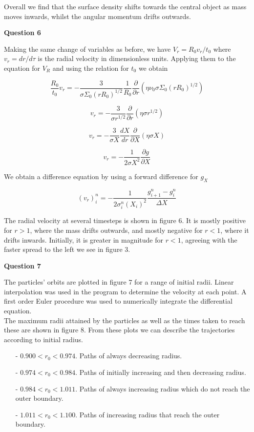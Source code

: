 \documentclass[12pt]{extarticle}
\begin{document}
Overall we find that the surface density shifts towards the central object as mass moves inwards, whilst the angular momentum drifts outwards.\\

\begin{center}
\textbf{Question 6}
\end{center}

Making the same change of variables as before, we have  $V_r = R_0 v_r/t_0$ where $v_r = dr/d \tau$ is the radial velocity in dimensionless units. Applying them to the equation for $V_R$ and using the relation for $t_0$ we obtain

$$\frac{R_0}{t_0}v_r = -\frac{3}{\sigma \Sigma_0 (rR_0)^{1/2}}\frac{1}{ R_0}\frac{\partial }{\partial r}(\eta \nu_0 \sigma\Sigma_0 (rR_0)^{1/2}) $$

$$v_r = -\frac{3}{\sigma r^{1/2}}\frac{\partial }{\partial r}(\eta \sigma r^{1/2})$$

$$v_r = -\frac{3}{\sigma X}\frac{dX}{dr}\frac{\partial }{\partial X}(\eta \sigma X)$$

$$v_r = -\frac{1}{2\sigma X^2}\frac{\partial g}{\partial X}$$

We obtain a difference equation by using a forward difference for $g_X$

$$(v_r)_i^n = -\frac{1}{2\sigma_i^n (X_i)^2}\frac{g_{i+1}^n - g_i^n}{\Delta X}$$

The radial velocity at several timesteps is shown in figure 6. It is mostly positive for $r>1$, where the mass drifts outwards, and mostly negative for $r<1$, where it drifts inwards. Initially, it is greater in magnitude  for $r<1$, agreeing with the faster spread to the left we see in figure 3.\\

\begin{center}
\textbf{Question 7}
\end{center}

The particles' orbits are plotted in figure 7 for a range of initial radii. Linear interpolation was used in the program to determine the velocity at each point. A first order Euler procedure was used to numerically integrate the differential equation.\\

The maximum radii attained by the particles as well as the times taken to reach these are shown in figure 8. From these plots we can describe the trajectories according to initial radius.
\begin{itemize}
\item[-] $0.900<r_0< 0.974$. Paths of always decreasing radius. 
\item[-] $0.974< r_0< 0.984$. Paths of initially increasing and then decreasing radius.
\item[-] $0.984< r_0< 1.011$. Paths of always increasing radius which do not reach the outer boundary.
\item[-] $1.011<r_0<1.100$. Paths of increasing radius that reach the outer boundary. \\
\end{itemize}
\end{document}
